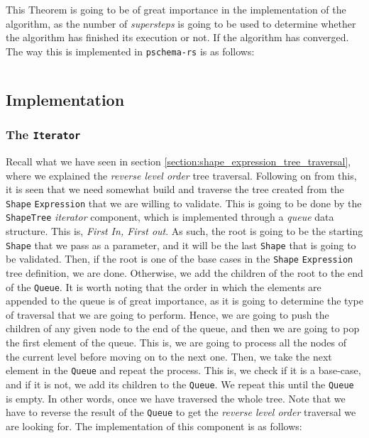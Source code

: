 This Theorem is going to be of great importance in the implementation of the algorithm, as the number of \textit{supersteps} is going to be used to determine whether the algorithm has finished its execution or not. If the algorithm has converged. The way this is implemented in \texttt{pschema-rs} is as follows:

\begin{code}
    \inputminted{rust}{code/listings/11-8_iterations.rs}
\end{code}

\subsection{Implementation}

\subsubsection{The \texttt{Iterator}}

Recall what we have seen in section \ref{section:shape_expression_tree_traversal}, where we explained the \textit{reverse level order} tree traversal. Following on from this, it is seen that we need somewhat build and traverse the tree created from the \texttt{Shape} \texttt{Expression} that we are willing to validate. This is going to be done by the \texttt{ShapeTree} \textit{iterator} component, which is implemented through a \textit{queue} data structure. This is, \textit{First In, First out}. As such, the root is going to be the starting \texttt{Shape} that we pass as a parameter, and it will be the last \texttt{Shape} that is going to be validated. Then, if the root is one of the base cases in the \texttt{Shape} \texttt{Expression} tree definition, we are done. Otherwise, we add the children of the root to the end of the \texttt{Queue}. It is worth noting that the order in which the elements are appended to the queue is of great importance, as it is going to determine the type of traversal that we are going to perform. Hence, we are going to push the children of any given node to the end of the queue, and then we are going to pop the first element of the queue. This is, we are going to process all the nodes of the current level before moving on to the next one. Then, we take the next element in the \texttt{Queue} and repeat the process. This is, we check if it is a base-case, and if it is not, we add its children to the \texttt{Queue}. We repeat this until the \texttt{Queue} is empty. In other words, once we have traversed the whole tree. Note that we have to reverse the result of the \texttt{Queue} to get the \textit{reverse level order} traversal we are looking for. The implementation of this component is as follows:

